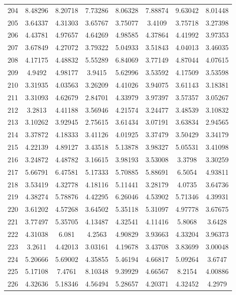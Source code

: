 \begin{center}
\begin{longtable}{cccccccc}
204 & 8.48296 & 8.20718 & 7.73286 & 8.06328 & 7.88874 & 9.63042 & 8.01448\\
205 & 3.64337 & 4.31303 & 3.65767 & 3.75077 & 3.4109 & 3.75718 & 3.27398\\
206 & 4.43781 & 4.97657 & 4.64269 & 4.98585 & 4.37864 & 4.41992 & 3.97353\\
207 & 3.67849 & 4.27072 & 3.79322 & 5.04933 & 3.51843 & 4.04013 & 3.46035\\
208 & 4.17175 & 4.48832 & 5.55289 & 6.84069 & 3.77149 & 4.87044 & 4.07615\\
209 & 4.9492 & 4.98177 & 3.9415 & 5.62996 & 3.53592 & 4.17509 & 3.53598\\
210 & 3.31935 & 4.03563 & 3.26209 & 4.41026 & 3.94075 & 3.61143 & 3.18381\\
211 & 3.31093 & 4.62679 & 2.84701 & 4.33979 & 3.97397 & 3.57357 & 3.05267\\
212 & 3.2813 & 4.41188 & 3.56946 & 4.21574 & 3.24477 & 3.48539 & 3.10832\\
213 & 3.10262 & 3.92945 & 2.75615 & 3.61434 & 3.07191 & 3.63834 & 2.94565\\
214 & 3.37872 & 4.18333 & 3.41126 & 4.01925 & 3.37479 & 3.50429 & 3.34179\\
215 & 4.22139 & 4.89127 & 3.43518 & 5.13878 & 3.98327 & 5.05531 & 3.41098\\
216 & 3.24872 & 4.48782 & 3.16615 & 3.98193 & 3.53008 & 3.3798 & 3.30259\\
217 & 5.66791 & 6.47581 & 5.17333 & 5.70885 & 5.88691 & 6.5054 & 4.93811\\
218 & 3.53419 & 4.32778 & 4.18116 & 5.11441 & 3.28179 & 4.0735 & 3.64736\\
219 & 4.38274 & 5.78876 & 4.42295 & 6.26046 & 4.53902 & 5.71346 & 4.39931\\
220 & 3.61202 & 4.57268 & 3.64502 & 5.35118 & 5.31097 & 4.97778 & 3.67675\\
221 & 3.77497 & 5.35705 & 4.13487 & 4.32541 & 4.11416 & 5.8068 & 3.6428\\
222 & 4.31038 & 6.081 & 4.2563 & 4.90829 & 3.93663 & 4.33204 & 3.96373\\
223 & 3.2611 & 4.42013 & 3.03161 & 4.19678 & 3.43708 & 3.83699 & 3.00048\\
224 & 5.20666 & 5.69002 & 4.35855 & 5.46194 & 4.66817 & 5.09264 & 3.6747\\
225 & 5.17108 & 7.4761 & 8.10348 & 9.39929 & 4.66567 & 8.2154 & 4.00886\\
226 & 4.32636 & 5.18346 & 4.56494 & 5.28657 & 4.20371 & 4.32452 & 4.2979\\

\end{longtable}
\end{center}
